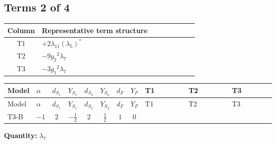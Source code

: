 \documentclass[8pt]{article}
\begin{document}
\begin{landscape}
\subsection*{Terms 2 of 4}
\begin{center}
\begin{tabular}{@{}c >{\raggedright\arraybackslash}p{0.82\linewidth}@{}}
\toprule
Column & Representative term structure \\
\midrule
T1 & \(\displaystyle +2 {\lambda_{11}} \left({\lambda_5}\right)^{*}\) \\
\midrule
T2 & \(\displaystyle -9 {g_2}^2 {\lambda_{7}}\) \\
\midrule
T3 & \(\displaystyle -3 {g_1}^2 {\lambda_{7}}\) \\
\midrule
\bottomrule
\end{tabular}
\end{center}
\smallskip
\tiny
\begin{longtable}{@{}llcccccc >{\raggedright\arraybackslash}p{0.21\linewidth} >{\raggedright\arraybackslash}p{0.21\linewidth} >{\raggedright\arraybackslash}p{0.21\linewidth}@{}}
\toprule
Model & $\alpha$ & $d_{S_1}$ & $Y_{S_1}$ & $d_{S_2}$ & $Y_{S_2}$ & $d_F$ & $Y_F$ & T1 & T2 & T3 \\
\midrule
\endfirsthead
\toprule
Model & $\alpha$ & $d_{S_1}$ & $Y_{S_1}$ & $d_{S_2}$ & $Y_{S_2}$ & $d_F$ & $Y_F$ & T1 & T2 & T3 \\
\midrule
\endhead
T3-B & $-1$ & $2$ & $-\frac{1}{2}$ & $2$ & $\frac{1}{2}$ & $1$ & $0$ & \scriptsize\adjustbox{max width=\linewidth}{$\begin{gathered} +2 {\lambda_{11}} \left({\lambda_5}\right)^{*}\end{gathered}$} & \scriptsize\adjustbox{max width=\linewidth}{$\begin{gathered} -9 {g_2}^2 {\lambda_{7}}\end{gathered}$} & \scriptsize\adjustbox{max width=\linewidth}{$\begin{gathered} -3 {g_1}^2 {\lambda_{7}}\end{gathered}$} \\
\midrule
\bottomrule
\end{longtable}
\clearpage
\noindent\textbf{Quantity: }$\lambda_{7}$\par\smallskip

\end{landscape}
\end{document}
